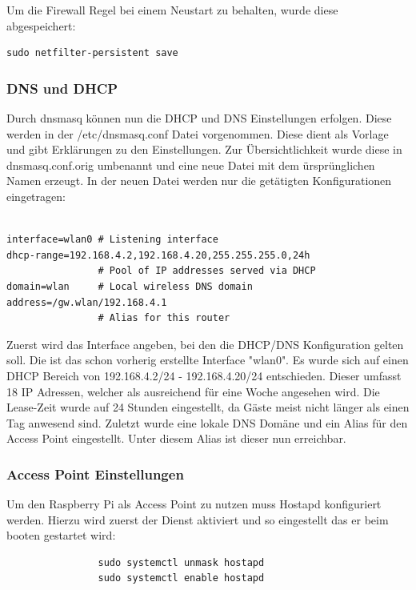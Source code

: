 \documentclass[a4paper,11pt,singlespacing]{article}
\begin{document}
                Um die Firewall Regel bei einem Neustart zu behalten, wurde diese abgespeichert:\\
                
                \begin{lstlisting}
sudo netfilter-persistent save
                \end{lstlisting}    
            \subsubsection{DNS und DHCP}
                Durch dnsmasq können nun die DHCP und DNS Einstellungen erfolgen. Diese werden in der /etc/dnsmasq.conf Datei vorgenommen. Diese dient als Vorlage und gibt Erklärungen zu den Einstellungen. Zur Übersichtlichkeit wurde diese in dnsmasq.conf.orig umbenannt und eine neue Datei mit dem ürsprünglichen Namen erzeugt. In der neuen Datei werden nur die getätigten Konfigurationen eingetragen:\\\\
            
            
                \begin{lstlisting}
interface=wlan0 # Listening interface
dhcp-range=192.168.4.2,192.168.4.20,255.255.255.0,24h
                # Pool of IP addresses served via DHCP
domain=wlan     # Local wireless DNS domain
address=/gw.wlan/192.168.4.1
                # Alias for this router
                \end{lstlisting}  
                Zuerst wird das Interface angeben, bei den die DHCP/DNS Konfiguration gelten soll. Die ist das schon vorherig erstellte Interface "wlan0". Es wurde sich auf einen DHCP Bereich von 192.168.4.2/24 - 192.168.4.20/24 entschieden. Dieser umfasst 18 IP Adressen, welcher als ausreichend für eine Woche angesehen wird. Die Lease-Zeit wurde auf 24 Stunden eingestellt, da Gäste meist nicht länger als einen Tag anwesend sind.
                Zuletzt wurde eine lokale DNS Domäne und ein Alias für den Access Point eingestellt. Unter diesem Alias ist dieser nun erreichbar.


            \subsubsection{Access Point Einstellungen}
                Um den Raspberry Pi als Access Point zu nutzen muss Hostapd konfiguriert werden. Hierzu wird zuerst der Dienst aktiviert und so eingestellt das er beim booten gestartet wird:\\
                  \begin{lstlisting}
                sudo systemctl unmask hostapd
                sudo systemctl enable hostapd
                  \end{lstlisting} 
                
\end{document}
